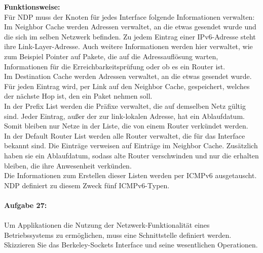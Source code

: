\documentclass[12pt,a4paper]{report}
\begin{document}
\textbf{Funktionsweise:}
\\
Für NDP muss der Knoten für jedes Interface folgende Informationen verwalten:\\
Im Neighbor Cache werden Adressen verwaltet, an die etwas gesendet wurde und die sich im selben Netzwerk befinden. Zu jedem Eintrag einer IPv6-Adresse steht ihre Link-Layer-Adresse. Auch weitere Informationen werden hier verwaltet, wie zum Beispiel Pointer auf Pakete, die auf die Adressauflösung warten, Informationen für die Erreichbarkeitsprüfung oder ob es ein Router ist.\\
Im Destination Cache werden Adressen verwaltet, an die etwas gesendet wurde. Für jeden Eintrag wird, per Link auf den Neighbor Cache, gespeichert, welches der nächste Hop ist, den ein Paket nehmen soll.\\
In der Prefix List werden die Präfixe verwaltet, die auf demselben Netz gültig sind. Jeder Eintrag, außer der zur link-lokalen Adresse, hat ein Ablaufdatum. Somit bleiben nur Netze in der Liste, die von einem Router verkündet werden.\\
In der Default Router List werden alle Router verwaltet, die für das Interface bekannt sind. Die Einträge verweisen auf Einträge im Neighbor Cache. Zusätzlich haben sie ein Ablaufdatum, sodass alte Router verschwinden und nur die erhalten bleiben, die ihre Anwesenheit verkünden.\\
Die Informationen zum Erstellen dieser Listen werden per ICMPv6 ausgetauscht. NDP definiert zu diesem Zweck fünf ICMPv6-Typen.
\\
\\
\textbf{Aufgabe 27:}
\\
\\
Um Applikationen die Nutzung der Netzwerk-Funktionalität eines Betriebssystems zu
ermöglichen, muss eine Schnittstelle definiert werden. Skizzieren Sie das Berkeley-Sockets
Interface und seine wesentlichen Operationen.
\\

\end{document}
